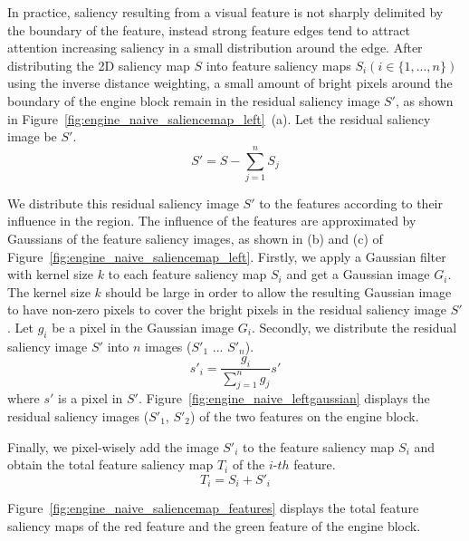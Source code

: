 In practice, saliency resulting from a visual feature is not sharply delimited by the boundary of the feature, instead strong feature edges tend to attract attention increasing saliency in a small distribution around the edge.
After distributing the 2D saliency map $ S $ into feature saliency maps $ S_{i} (i \in \{1,...,n\})$ using the inverse distance weighting, a small amount of bright pixels around the boundary of the engine block remain in the residual saliency image $ S' $, as shown in Figure~\ref{fig:engine_naive_saliencemap_left}~(a).
Let the residual saliency image be $ S' $.
\[ S'=S- \sum_{j=1}^{n} S_{j} \]

We distribute this residual saliency image $ S' $ to the features according to their influence in the region. The influence of the features are approximated by Gaussians of the feature saliency images, as shown in (b) and (c) of Figure~\ref{fig:engine_naive_saliencemap_left}.
Firstly, we apply a Gaussian filter with kernel size $ k $ to each feature saliency map $ S_{i} $ and get a Gaussian image $ G_{i} $.
The kernel size $ k $ should be large in order to allow the resulting Gaussian image to have non-zero pixels to cover the bright pixels in the residual saliency image $ S' $.
Let $ g_{i} $ be a pixel in the Gaussian image $ G_{i} $.
Secondly, we distribute the residual saliency image $ S' $ into $ n $ images ($ S'_{1} $ ... $ S'_{n} $).
\[ s'_{i} = \frac{ g_{i} }{ \sum_{j=1}^{n} g_{j} }s' \]
where $ s' $ is a pixel in $ S' $.
Figure~\ref{fig:engine_naive_leftgaussian} displays the residual saliency images ($ S'_{1} $, $ S'_{2} $) of the two features on the engine block. 

Finally, we pixel-wisely add the image $ S'_{i} $ to the feature saliency map $ S_{i} $ and obtain the total feature saliency map $ T_{i} $ of the $i$-$th$ feature.
\[ T_{i} =S_{i}+S'_{i}\]

Figure~\ref{fig:engine_naive_saliencemap_features} displays the total feature saliency maps of the red feature and the green feature of the engine block.

